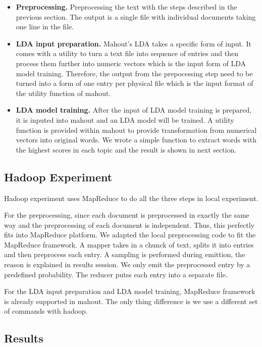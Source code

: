 \documentclass[conference]{IEEEtran}
\begin{document}
\begin{itemize}
	\item \textbf{Preprocessing.} Preprocessing the text with the steps described in the previous section. The output is a single file with individual documents taking one line in the file.
	\item \textbf{LDA input preparation.} Mahout's LDA takes a specific form of input. It comes with a utility to turn a text file into sequence of entries and then process them further into numeric vectors which is the input form of LDA model training. Therefore, the output from the prepocessing step need to be turned into a form of one entry per physical file which is the input format of the utility function of mahout.
	\item \textbf{LDA model training.} After the input of LDA model training is prepared, it is inputed into mahout and an LDA model will be trained. A utility function is provided within mahout to provide transformation from numerical vectors into original words. We wrote a simple function to extract words with the highest scores in each topic and the result is shown in next section.
\end{itemize}

\subsection{Hadoop Experiment}

Hadoop experiment uses MapReduce to do all the three steps in local experiment.

For the preprocessing, since each document is preprocessed in exactly the same way and the preprocessing of each document is independent. Thus, this perfectly fits into MapReduce platform. We adapted the local preprocessing code to fit the MapReduce framework. A mapper takes in a chunck of text, splits it into entries and then preprocess each entry. A sampling is performed during emittion, the reason is explained in results session. We only emit the preprocessed entry by a predefined probability. The reducer putss each entry into a separate file.

For the LDA input preparation and LDA model training, MapReduce framework is already supported in mahout. The only thing difference is we use a different set of commands with hadoop. 
\subsection{Results}
\end{document}

